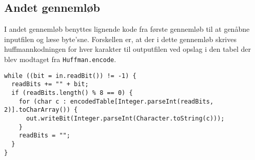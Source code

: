 \documentclass{article}
\begin{document}
\subsection*{Andet gennemløb}

I andet gennemløb benyttes lignende kode fra første gennemløb til at genåbne inputfilen og læse byte'sne. Forskellen er, at der i dette gennemløb skrives huffmannkodningen for hver karakter til outputfilen ved opslag i den tabel der blev modtaget fra \texttt{Huffman.encode}.

\begin{lstlisting}
while ((bit = in.readBit()) != -1) {
  readBits += "" + bit;
  if (readBits.length() % 8 == 0) {
    for (char c : encodedTable[Integer.parseInt(readBits, 2)].toCharArray()) {
      out.writeBit(Integer.parseInt(Character.toString(c)));
    }
    readBits = "";
  }
}
\end{lstlisting}


\newpage
\end{document}
